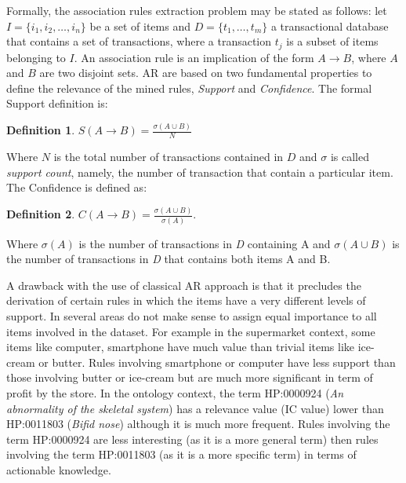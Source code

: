 \documentclass{article}
\theoremstyle{definition}
\newtheorem{definition}{Definition}[section]
\begin{document}
Formally, the association rules extraction problem may be stated as follows: let $ I=\{i_1,i_2,\ldots,i_{n}\}$ be a set of items %
and $D = \{t_1, \ldots, t_m \}$ a transactional database that contains a set of transactions, where %
 a transaction $t_j$ is a subset of items belonging to $I$. An association rule is an implication of the form $A \rightarrow B$, where $A$ and $B$ are two disjoint sets. %
 AR are based on two fundamental properties to define the relevance of the mined rules, \textit{Support} and \textit{Confidence}.
The formal Support definition is: 
\begin{definition}
\centering	
	$S(A \rightarrow B) = \frac{  \sigma (A \cup B)}{N} $
\end{definition}
Where $N$ is the total number of transactions contained in $D$ and $\sigma$ is called \textit{support count}, namely, the number of transaction that contain a particular item.
\newline The Confidence is defined as: 
\begin{definition}
\centering	
	$C(A \rightarrow B) = \frac{  \sigma (A \cup B)}{\sigma (A)} $.
\end{definition}

Where $\sigma(A)$ is the number of transactions in \textit{D} containing A and $\sigma(A\cup B)$ is the number of transactions in \textit{D} that contains both items A and B.\newline

A drawback with the use of classical AR approach is that it precludes the derivation of certain rules in which the items have a very different levels of support. In several areas do not make sense to assign equal importance to all items involved in the dataset. For example in the supermarket context, some items like computer, smartphone have much  value than trivial items like ice-cream or butter. Rules involving smartphone or computer have less support than those involving butter or ice-cream but are much more significant in term of profit by the store. In the ontology context, the term HP:0000924 (\textit{An abnormality of the skeletal system}) has a relevance value (IC value) lower than HP:0011803 (\textit{Bifid nose}) although it is much more frequent. Rules involving the term HP:0000924 are less interesting (as it is a more general term) then rules involving the term HP:0011803 (as it is a more specific term) in terms of actionable knowledge. 
\end{document}
